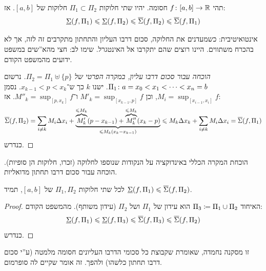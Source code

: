 \documentclass[name=רשימות חדו''א 2א]{../../../tex/classes/noChapterMegasumPreamble}
\begin{document}
	\begin{Theorem}
		תהי $f \colon [a, b] \to \mathbb{R}$ חסומה. יהיו שתי חלוקות $\Pi_1 \subset \Pi_2$ חלוקות של $[a, b]$. אז:
		\[ \underline{\Sigma}(f, \Pi_1) \leqslant \underline{\Sigma}(f, \Pi_2) \leqslant \overline{\Sigma}(f, \Pi_2) \leqslant \overline{\Sigma}(f, \Pi_1) \]
	\end{Theorem}
	אינטואיטיבית: כשמעדנים את החלוקה, סכום דרבו העליון והתחתון מתקרבים זה לזה, אך לא בהכרח משתווים. היינו רוצים שהם יתקרבו אל האינטגרל. שימו לב: חצי מהא''שים במשפט ידועים מהמשפט הקודם.
	\begin{proof}[הוכחה עבור סכום דרבו עליון, במקרה הפרטי של $\Pi_2 = \Pi_1 \uplus \{p\}$]
		נרשום $\Pi_1 \colon a = x_0 < x_1 < \cdots < x_n = b$. ישנו $k$ כך ש־$x_{k - 1} < p < x_k$. נסמן $M_i = \sup_{[x_{i - 1}, x_i]} f$, וכן $M'_k = \sup_{[x_{k - 1}, p]} f$ ו־$M''_k = \sup_{[p, x_k]}f$. אז:
		\[ \overline{\Sigma}(f, \Pi_2) = \sum_{i \neq k} M_i \Delta x_i  + \underbrace{\overbrace{M'_k}^{\leqslant M_k}(p - x_{k - 1}) + \overbrace{M''_k}^{\leqslant M_k}(x_k - p)}_{\leqslant M_k(x_k - x_{k -1})} \leqslant M_k\Delta x_k + \sum_{i \neq k} M_i\Delta x_i = \overline{\Sigma}(f, \Pi_1) \]
		כנדרש.
	\end{proof}
	הוכחת המקרה הכללי באינדוקציה על הנקודות שנוספו לחלוקה (זכרו, חלוקות הן סופיות). הוכחה עבור סכום דרבו תחתון מדואליות.

	\begin{Collary}
		לכל שתי חלוקות $\Pi_1, \Pi_2$ של $[a, b]$, תמיד $\underline{\Sigma}(f, \Pi_1) \leqslant \overline{\Sigma}(f, \Pi_2)$.
	\end{Collary}
	\begin{proof}
		האיחוד $\Pi_3 \coloneqq \Pi_1 \cup \Pi_2$ הוא עידון של $\Pi_1$ ושל $\Pi_2$ (עידון משותף). מהמשפט הקודם:
		\[ \underline{\Sigma}(f, \Pi_1) \leqslant \underline{\Sigma}(f, \Pi_3) \leqslant \overline{\Sigma}(f, \Pi_3) \leqslant \overline{\Sigma}(f, \Pi_2) \]
		כנדרש.
	\end{proof}
	זו מסקנה נחמדה, שאומרת שקבוצת כל סכומי הדרבו העליונים חסומה מלמטה (ע''י סכום דרבו תחתון כלשהו) ולהפך. זה אומר שקיים לה סופרמום.


\end{document}
